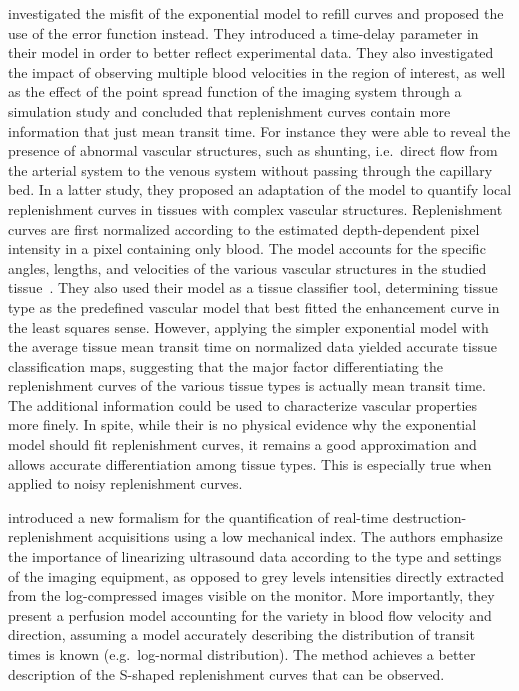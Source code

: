 \citet{Potdevin:2004eq} investigated the misfit of the exponential model to refill curves and proposed the use of the error function instead.
They introduced a time-delay parameter in their model in order to better reflect experimental data. 
They also investigated the impact of observing multiple blood velocities in the region of interest, as well as the effect of the point spread function of the imaging system through a simulation study and concluded that replenishment curves contain more information that just mean transit time. 
For instance they were able to reveal the presence of abnormal vascular structures, such as shunting, i.e.~direct flow from the arterial system to the venous system without passing through the capillary bed.
In a latter study, they proposed an adaptation of the model to quantify local replenishment curves in tissues with complex vascular structures.
Replenishment curves are first normalized according to the estimated depth-dependent pixel intensity in a pixel containing only blood.
The model accounts for the specific angles, lengths, and velocities of the various vascular structures in the studied tissue~\cite{Potdevin:2006fs}. %
They also used their model as a tissue classifier tool, determining tissue type as the predefined vascular model that best fitted the enhancement curve in the least squares sense.
However, applying the simpler exponential model with the average tissue mean transit time on normalized data yielded accurate tissue classification maps, suggesting that the major factor differentiating the replenishment curves of the various tissue types is actually mean transit time.
The additional information could be used to characterize vascular properties more finely.
In spite, while their is no physical evidence why the exponential model should fit replenishment curves, it remains a good approximation and allows accurate differentiation among tissue types.
This is especially true when applied to noisy replenishment curves.

\citet{Arditi:2006ip} introduced a new formalism for the quantification of real-time destruction-replenishment acquisitions using a low mechanical index. %
The authors emphasize the importance of linearizing ultrasound data according to the type and settings of the imaging equipment, as opposed to grey levels intensities directly extracted from the log-compressed images visible on the monitor.
More importantly, they present a perfusion model accounting for the variety in blood flow velocity and direction, assuming a model accurately describing the distribution of transit times is known (e.g.~log-normal distribution).
The method achieves a better description of the S-shaped replenishment curves that can be observed.

